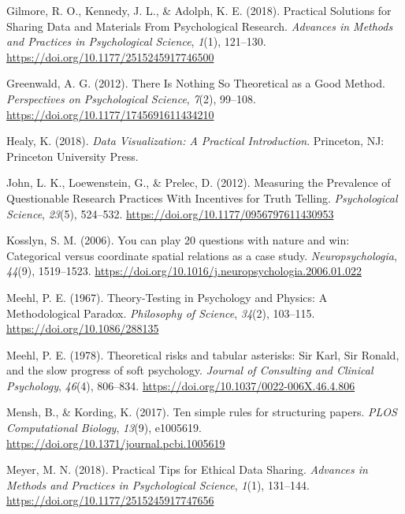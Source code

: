 \documentclass[11pt,man]{article}
\begin{document}
\hypertarget{ref-gilmore_practical_2018}{}
Gilmore, R. O., Kennedy, J. L., \& Adolph, K. E. (2018). Practical
Solutions for Sharing Data and Materials From Psychological Research.
\emph{Advances in Methods and Practices in Psychological Science},
\emph{1}(1), 121--130. \url{https://doi.org/10.1177/2515245917746500}

\hypertarget{ref-greenwald_there_2012}{}
Greenwald, A. G. (2012). There Is Nothing So Theoretical as a Good
Method. \emph{Perspectives on Psychological Science}, \emph{7}(2),
99--108. \url{https://doi.org/10.1177/1745691611434210}

\hypertarget{ref-healy_data_2018}{}
Healy, K. (2018). \emph{Data Visualization: A Practical Introduction}.
Princeton, NJ: Princeton University Press.

\hypertarget{ref-john_measuring_2012}{}
John, L. K., Loewenstein, G., \& Prelec, D. (2012). Measuring the
Prevalence of Questionable Research Practices With Incentives for Truth
Telling. \emph{Psychological Science}, \emph{23}(5), 524--532.
\url{https://doi.org/10.1177/0956797611430953}

\hypertarget{ref-kosslyn_you_2006}{}
Kosslyn, S. M. (2006). You can play 20 questions with nature and win:
Categorical versus coordinate spatial relations as a case study.
\emph{Neuropsychologia}, \emph{44}(9), 1519--1523.
\url{https://doi.org/10.1016/j.neuropsychologia.2006.01.022}

\hypertarget{ref-meehl_theory-testing_1967}{}
Meehl, P. E. (1967). Theory-Testing in Psychology and Physics: A
Methodological Paradox. \emph{Philosophy of Science}, \emph{34}(2),
103--115. \url{https://doi.org/10.1086/288135}

\hypertarget{ref-meehl_theoretical_1978}{}
Meehl, P. E. (1978). Theoretical risks and tabular asterisks: Sir Karl,
Sir Ronald, and the slow progress of soft psychology. \emph{Journal of
Consulting and Clinical Psychology}, \emph{46}(4), 806--834.
\url{https://doi.org/10.1037/0022-006X.46.4.806}

\hypertarget{ref-mensh_ten_2017}{}
Mensh, B., \& Kording, K. (2017). Ten simple rules for structuring
papers. \emph{PLOS Computational Biology}, \emph{13}(9), e1005619.
\url{https://doi.org/10.1371/journal.pcbi.1005619}

\hypertarget{ref-meyer_practical_2018}{}
Meyer, M. N. (2018). Practical Tips for Ethical Data Sharing.
\emph{Advances in Methods and Practices in Psychological Science},
\emph{1}(1), 131--144. \url{https://doi.org/10.1177/2515245917747656}
\end{document}
